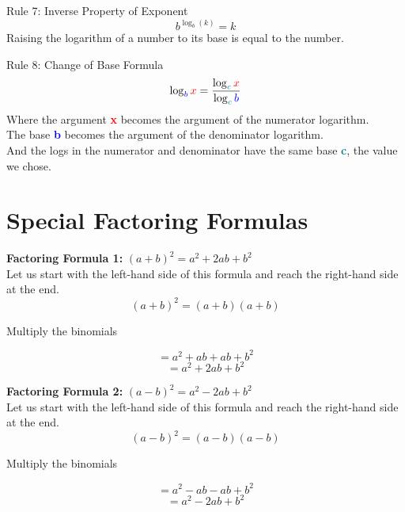\begin{framed}
  \noindent Rule 7: Inverse Property of Exponent 
  \begin{equation*}
    b^{\log_b (k)}=k
  \end{equation*}
  \noindent Raising the logarithm of a number to its base is equal to the 
  number.
\end{framed}

\begin{framed}
  \noindent Rule 8: Change of Base Formula
  \begin{equation*}
    \log_{\textcolor{blue}b} \textcolor{red}x 
    = \frac{\log_{\textcolor{teal}c} \textcolor{red}x}{\log_{\textcolor{teal}c} 
    \textcolor{blue}b}
  \end{equation*}
  \noindent Where the argument \textbf{\textcolor{red}x} becomes the argument 
  of the numerator logarithm.\\
  The base \textbf{\textcolor{blue}b} becomes the argument of the denominator 
  logarithm.\\
  And the logs in the numerator and denominator have the same base 
  \textbf{\textcolor{teal}c}, the value we chose.
\end{framed} 


\section{Special Factoring Formulas}

\begin{framed}
  \noindent \textbf{Factoring Formula 1:} $(a+b)^2=a^2+2ab+b^2$\\
  \noindent Let us start with the left-hand side of this formula and reach the 
  right-hand side at the end.\\
  \begin{equation*}
    (a+b)^2 = (a+b)(a+b)
  \end{equation*}
  \centerline {Multiply the binomials}
  \begin{equation*}
    = a^2 + ab + ab + b^2
  \end{equation*}
  \begin{equation*}
    =a^2 + 2ab + b^2
  \end{equation*}
\end{framed}

\begin{framed}
  \noindent \textbf{Factoring Formula 2:} $(a-b)^2=a^2-2ab+b^2$\\
  \noindent Let us start with the left-hand side of this formula and reach the 
  right-hand side at the end.\\
  \begin{equation*}
    (a-b)^2 = (a-b)(a-b)
  \end{equation*}
  \centerline {Multiply the binomials}
  \begin{equation*}
    = a^2 - ab - ab + b^2
  \end{equation*}
  \begin{equation*}
    =a^2 - 2ab + b^2
  \end{equation*}
\end{framed}


